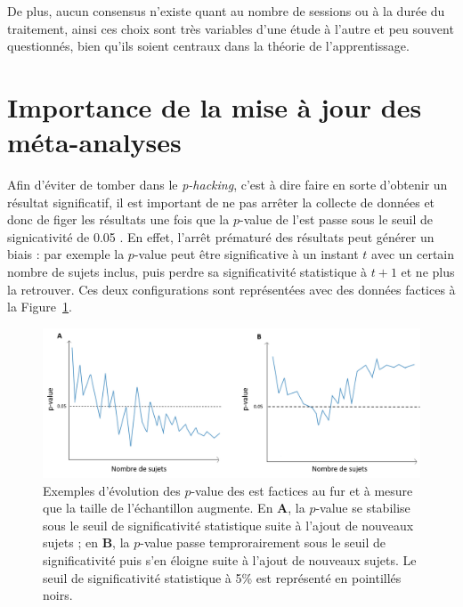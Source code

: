 De plus, aucun consensus n'existe quant au nombre de sessions ou à la durée du traitement, ainsi ces choix sont très variables d'une étude à l'autre et peu
souvent questionnés, bien qu'ils soient centraux dans la théorie de l'apprentissage.


\section{Importance de la mise à jour des méta-analyses} \label{need_to_update_meta_analysis}

Afin d'éviter de tomber dans le \textit{p-hacking}, c'est à dire faire en sorte d'obtenir un résultat significatif, il est important de ne pas arrêter la collecte de données 
et donc de figer les résultats une fois que la $p$-value de l'\gls{est} passe sous le seuil de signicativité de 0.05 \citep{Head2015, Coffman2015}. En effet, l'arrêt prématuré des résultats peut
générer un biais : par exemple la $p$-value peut être significative à un instant $t$ avec un certain nombre de sujets inclus, puis perdre sa significativité statistique à
$t + 1$ et ne plus la retrouver. Ces deux configurations sont représentées avec des données factices à la Figure~\ref{Figure:meta-analysis-evolution-p-value-examples}.

\begin{figure}[h!]
  \centering
	\includegraphics[width=1\linewidth]{figures/chapter-2/meta-analysis-evolution-p-value-examples} 
  \caption[Exemples d'évolution des $p$-value des  factices au fur et à mesure que la taille de l'échantillon augmente.]
	{Exemples d'évolution des $p$-value des \gls{est} factices au fur et à mesure que la taille de l'échantillon augmente. 
	En \textbf{A}, la $p$-value se stabilise sous le seuil de significativité statistique suite à l'ajout de nouveaux sujets ; en \textbf{B}, la $p$-value 
	passe temprorairement sous le seuil de significativité puis s'en éloigne suite à l'ajout de nouveaux sujets. 
	Le seuil de significativité statistique à 5\% est représenté en pointillés noirs.}
  \label{Figure:meta-analysis-evolution-p-value-examples}
\end{figure}

